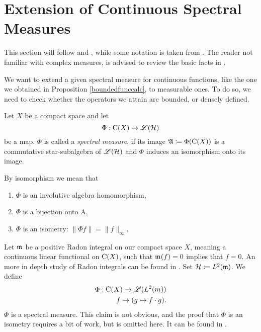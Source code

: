 
\section{Extension of Continuous Spectral Measures}

This section will follow \cite{LesHaupt} and \cite[pp. 341-]{RudinFuncAna}
, while some notation
is taken from \cite[Ch. 6]{PedAnaN}. The reader not familiar
with complex measures, is advised to review the basic facts in 
\cite[Ch. 6]{RudinRealComp}.

We want to extend a given spectral measure for continuous functions,
like the one we obtained in Proposition \ref{boundedfunccalc}, to measurable ones. 
To do so, we need to check whether the operators we attain
are bounded, or densely defined.
\begin{defi}
 
 Let $X$ be a compact space and let
 \[
  \Phi : \operatorname{C} (X) \to \mathscr{L}(\mathcal{H})
 \]
be a map. $\Phi$ is called a \textit{spectral measure}, if its image 
$\mathfrak{A} \coloneqq \Phi(\operatorname{C} (X))$ is a commutative star-subalgebra of $\mathscr{L}(\mathcal{H})$ and 
$\Phi$ induces an isomorphism onto its image.
\end{defi}

\begin{rem}
 By isomorphism we mean that
 \begin{enumerate}
  \item $\Phi$ is an involutive algebra homomorphism,
  \item $\Phi$ is a bijection onto A,
  \item $\Phi$ is an isometry: $\| \Phi f \| = \| f \|_\infty$.
 \end{enumerate}

\end{rem}

\begin{expl}
Let $\mathfrak{m}_{}$ be a positive Radon integral on our compact space $X$, meaning a
continuous linear functional on $\operatorname{C} (X)$, such that $\mathfrak{m}_{}(f) = 0$ implies 
that $f=0$. An more in depth study of Radon integrals can be found in 
\cite[Chapter~6.1]{PedAnaN}. Set $\mathcal{H} \coloneqq L^2(\mathfrak{m})$.
We define 
\begin{align*}
 \Phi : \operatorname{C}(X) \to \mathscr{L}({L^2({m})}) \\
 f \mapsto (g \mapsto f\cdot g).
\end{align*}
$\Phi$ is a spectral measure. This claim is not obvious, and the proof
that $\Phi$ is an isometry requires a bit of work, but is omitted here.
It can be found in \cite{LesHaupt}. 
\end{expl}

